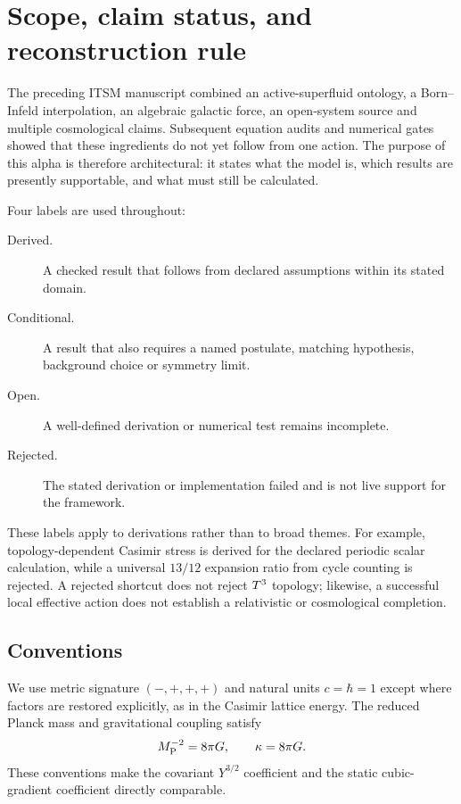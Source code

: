 \section{Scope, claim status, and reconstruction rule}

The preceding ITSM manuscript combined an active-superfluid ontology, a
Born--Infeld interpolation, an algebraic galactic force, an open-system source
and multiple cosmological claims.  Subsequent equation audits and numerical
gates showed that these ingredients do not yet follow from one action.  The
purpose of this alpha is therefore architectural: it states what the model is,
which results are presently supportable, and what must still be calculated.

Four labels are used throughout:

\begin{description}
\item[Derived.] A checked result that follows from declared assumptions within
its stated domain.
\item[Conditional.] A result that also requires a named postulate, matching
hypothesis, background choice or symmetry limit.
\item[Open.] A well-defined derivation or numerical test remains incomplete.
\item[Rejected.] The stated derivation or implementation failed and is not live
support for the framework.
\end{description}

These labels apply to derivations rather than to broad themes.  For example,
topology-dependent Casimir stress is derived for the declared periodic scalar
calculation, while a universal $13/12$ expansion ratio from cycle counting is
rejected.  A rejected shortcut does not reject $T^3$ topology; likewise, a
successful local effective action does not establish a relativistic or
cosmological completion.

\subsection{Conventions}

We use metric signature $(-,+,+,+)$ and natural units $c=\hbar=1$ except
where factors are restored explicitly, as in the Casimir lattice energy.  The
reduced Planck mass and gravitational coupling satisfy
\begin{equation}
 M_{\mathrm P}^{-2}=8\pi G,
 \qquad
 \kappa=8\pi G.
 \label{eq:conventions}
\end{equation}
These conventions make the covariant $Y^{3/2}$ coefficient and the static
cubic-gradient coefficient directly comparable.

